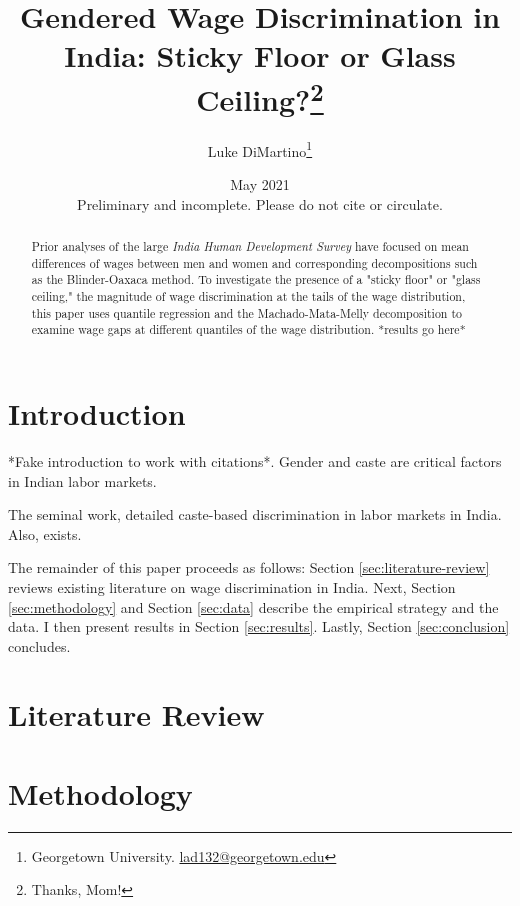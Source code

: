\documentclass[12pt]{article}
\title{
Gendered Wage Discrimination in India: Sticky Floor or Glass Ceiling?\thanks{Thanks, Mom!}}
\author{Luke DiMartino\thanks{Georgetown University. \href{mailto:lad132@georgetown.edu}{lad132@georgetown.edu}}}
\date{May 2021 \\
\vspace*{.3cm}Preliminary and incomplete. Please do not cite or circulate.}
\begin{document}
\bgroup

\let\footnoterule\relax

\begin{singlespace}
\maketitle

\begin{abstract}
Prior analyses of the large \textit{India Human Development Survey} have focused on mean differences of wages between men and women and corresponding decompositions such as the Blinder-Oaxaca method. To investigate the presence of a "sticky floor" or "glass ceiling," the magnitude of wage discrimination at the tails of the wage distribution, this paper uses quantile regression and the Machado-Mata-Melly decomposition to examine wage gaps at different quantiles of the wage distribution. *results go here* 
\end{abstract}
\end{singlespace}
\thispagestyle{empty}

\clearpage
\egroup
\setcounter{page}{1}

\section{Introduction
\label{sec:introduction}}

*Fake introduction to work with citations*. Gender and caste are critical factors in Indian labor markets. 

The seminal work, \citet{BanerjeeandKnight1985} detailed caste-based discrimination in labor markets in India. Also, \citet{Agrawal2014} exists.

The remainder of this paper proceeds as follows: Section \ref{sec:literature-review} reviews existing literature on wage discrimination in India. Next, Section \ref{sec:methodology} and Section \ref{sec:data} describe the empirical strategy and the data. I then present results in Section \ref{sec:results}. Lastly, Section \ref{sec:conclusion} concludes. 

\section{Literature Review
\label{sec:literature-review}}

\section{Methodology
\label{sec:methodology}}
\end{document}
